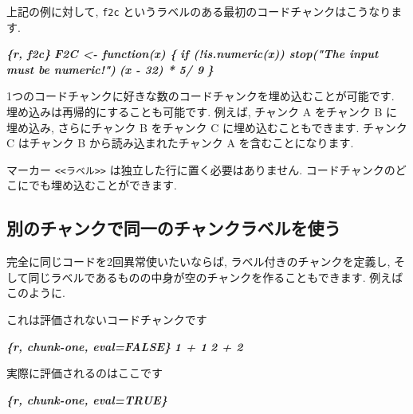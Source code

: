 \documentclass[
  11pt,
]{bxjsreport}
\newenvironment{Shaded}{\begin{snugshade}}{\end{snugshade}}
\newcommand{\InformationTok}[1]{\textcolor[rgb]{0.56,0.35,0.01}{\textbf{\textit{#1}}}}
\newcommand{\NormalTok}[1]{#1}
\begin{document}
上記の例に対して, \texttt{f2c} というラベルのある最初のコードチャンクはこうなります.

\begin{Shaded}
\begin{Highlighting}[]
\InformationTok{\textasciigrave{}\textasciigrave{}\textasciigrave{}\{r, f2c\}}
\InformationTok{F2C \textless{}{-} function(x) \{}
\InformationTok{  if (!is.numeric(x)) stop("The input must be numeric!")}
\InformationTok{  (x {-} 32) * 5/ 9}
\InformationTok{\}}
\InformationTok{\textasciigrave{}\textasciigrave{}\textasciigrave{}}
\end{Highlighting}
\end{Shaded}

1つのコードチャンクに好きな数のコードチャンクを埋め込むことが可能です. 埋め込みは再帰的にすることも可能です. 例えば, チャンク A をチャンク B に埋め込み, さらにチャンク B をチャンク C に埋め込むこともできます. チャンク C はチャンク B から読み込まれたチャンク A を含むことになります.

マーカー \texttt{\textless{}\textless{}ラベル\textgreater{}\textgreater{}} は独立した行に置く必要はありません. コードチャンクのどこにでも埋め込むことができます.

\hypertarget{same-label}{%
\subsection{別のチャンクで同一のチャンクラベルを使う}\label{same-label}}

完全に同じコードを2回異常使いたいならば, ラベル付きのチャンクを定義し, そして同じラベルであるものの中身が空のチャンクを作ることもできます. 例えばこのように.

\begin{Shaded}
\begin{Highlighting}[]
\NormalTok{これは評価されないコードチャンクです}

\InformationTok{\textasciigrave{}\textasciigrave{}\textasciigrave{}\{r, chunk{-}one, eval=FALSE\}}
\InformationTok{1 + 1}
\InformationTok{2 + 2}
\InformationTok{\textasciigrave{}\textasciigrave{}\textasciigrave{}}

\NormalTok{実際に評価されるのはここです}

\InformationTok{\textasciigrave{}\textasciigrave{}\textasciigrave{}\{r, chunk{-}one, eval=TRUE\}}
\InformationTok{\textasciigrave{}\textasciigrave{}\textasciigrave{}}
\end{Highlighting}
\end{Shaded}
\end{document}
